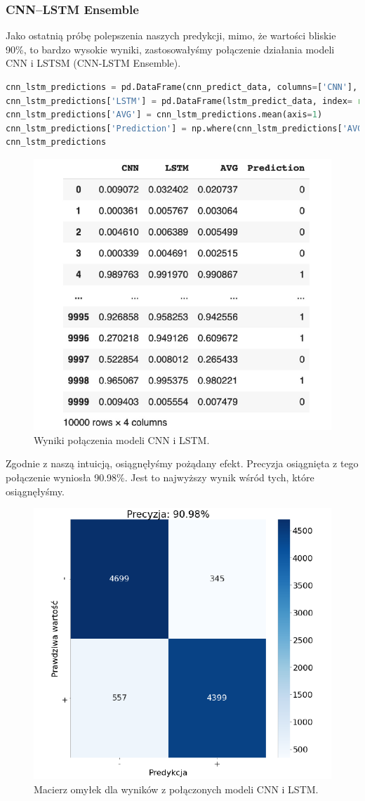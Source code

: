 \subsubsection{CNN--LSTM Ensemble}
Jako ostatnią próbę polepszenia naszych predykcji, mimo, że wartości bliskie 90\%, to bardzo wysokie wyniki, zastosowałyśmy połączenie działania modeli CNN i LSTSM (CNN-LSTM Ensemble).

\begin{lstlisting}[language=Python,frame=single, breaklines=true, caption=Model stworzony przez połączenie CCN z LSTM.,label=code:cnn-lstm]
cnn_lstm_predictions = pd.DataFrame(cnn_predict_data, columns=['CNN'], index= range(0,len(test_data)))
cnn_lstm_predictions['LSTM'] = pd.DataFrame(lstm_predict_data, index= range(0,len(test_data)))
cnn_lstm_predictions['AVG'] = cnn_lstm_predictions.mean(axis=1)
cnn_lstm_predictions['Prediction'] = np.where(cnn_lstm_predictions['AVG']>0.5, 1, 0)
cnn_lstm_predictions
\end{lstlisting}


\begin{figure}[H]
	\centering
	\includegraphics[width=0.55\linewidth]{images/chapter3/cnn-lstm.pdf}
	\caption{Wyniki połączenia modeli CNN i LSTM.}
	\label{fig:cnn-lstm}
\end{figure}


\noindent Zgodnie z naszą intuicją, osiągnęłyśmy pożądany efekt. Precyzja osiągnięta z tego połączenie wyniosła 90.98\%. Jest to najwyższy wynik wśród tych, które osiągnęłyśmy.

\begin{figure}[H]
	\centering
	\includegraphics[width=0.55\linewidth]{images/chapter3/cnn-lstm-macierz.pdf}
	\caption{Macierz omyłek dla wyników z połączonych modeli CNN i LSTM.}
	\label{fig:cnn-lstm-macierz}
\end{figure}

